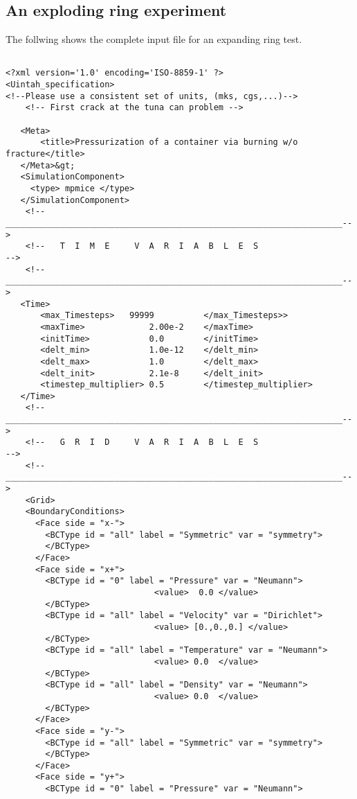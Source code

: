   \subsection{An exploding ring experiment}
  The follwing shows the complete input file for an expanding ring test.
  \lstset{language=XML}
  \begin{lstlisting}

<?xml version='1.0' encoding='ISO-8859-1' ?>
<Uintah_specification> 
<!--Please use a consistent set of units, (mks, cgs,...)-->
    <!-- First crack at the tuna can problem -->

   <Meta>
       <title>Pressurization of a container via burning w/o fracture</title>
   </Meta>&gt;    
   <SimulationComponent>
     <type> mpmice </type>
   </SimulationComponent>
    <!--____________________________________________________________________-->
    <!--   T  I  M  E     V  A  R  I  A  B  L  E  S                         -->
    <!--____________________________________________________________________-->
   <Time>
       <max_Timesteps>   99999          </max_Timesteps>>
       <maxTime>             2.00e-2    </maxTime>
       <initTime>            0.0        </initTime>
       <delt_min>            1.0e-12    </delt_min>
       <delt_max>            1.0        </delt_max>
       <delt_init>           2.1e-8     </delt_init>
       <timestep_multiplier> 0.5        </timestep_multiplier>
   </Time>    
    <!--____________________________________________________________________-->
    <!--   G  R  I  D     V  A  R  I  A  B  L  E  S                         -->
    <!--____________________________________________________________________-->
    <Grid>
    <BoundaryConditions>
      <Face side = "x-">
        <BCType id = "all" label = "Symmetric" var = "symmetry">
        </BCType>
      </Face>
      <Face side = "x+">
        <BCType id = "0" label = "Pressure" var = "Neumann">
                              <value>  0.0 </value>
        </BCType>
        <BCType id = "all" label = "Velocity" var = "Dirichlet">
                              <value> [0.,0.,0.] </value>
        </BCType>
        <BCType id = "all" label = "Temperature" var = "Neumann">
                              <value> 0.0  </value>
        </BCType>
        <BCType id = "all" label = "Density" var = "Neumann">
                              <value> 0.0  </value>
        </BCType>
      </Face>
      <Face side = "y-">
        <BCType id = "all" label = "Symmetric" var = "symmetry">
        </BCType>
      </Face>                  
      <Face side = "y+">
        <BCType id = "0" label = "Pressure" var = "Neumann">

\end{lstlisting}
